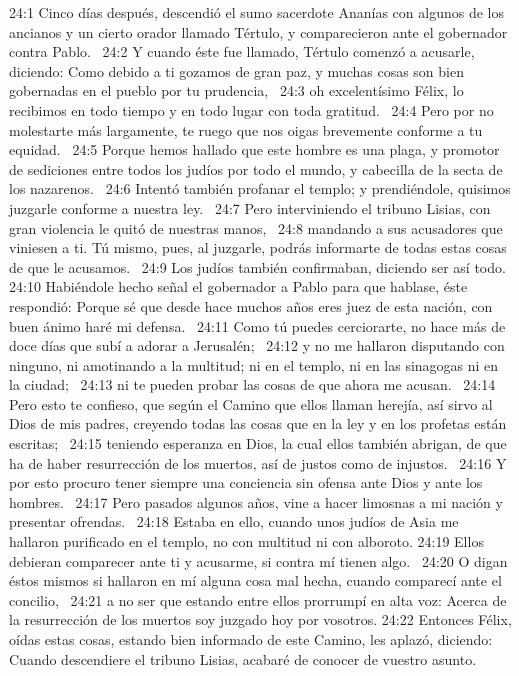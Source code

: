 24:1 Cinco días después, descendió el sumo sacerdote Ananías con algunos de los ancianos y un cierto orador llamado Tértulo, y comparecieron ante el gobernador contra Pablo.  
24:2 Y cuando éste fue llamado, Tértulo comenzó a acusarle, diciendo: Como debido a ti gozamos de gran paz, y muchas cosas son bien gobernadas en el pueblo por tu prudencia,  
24:3 oh excelentísimo Félix, lo recibimos en todo tiempo y en todo lugar con toda gratitud.  
24:4 Pero por no molestarte más largamente, te ruego que nos oigas brevemente conforme a tu equidad.  
24:5 Porque hemos hallado que este hombre es una plaga, y promotor de sediciones entre todos los judíos por todo el mundo, y cabecilla de la secta de los nazarenos.  
24:6 Intentó también profanar el templo; y prendiéndole, quisimos juzgarle conforme a nuestra ley.  
24:7 Pero interviniendo el tribuno Lisias, con gran violencia le quitó de nuestras manos,  
24:8 mandando a sus acusadores que viniesen a ti. Tú mismo, pues, al juzgarle, podrás informarte de todas estas cosas de que le acusamos.  
24:9 Los judíos también confirmaban, diciendo ser así todo.  
24:10 Habiéndole hecho señal el gobernador a Pablo para que hablase, éste respondió: Porque sé que desde hace muchos años eres juez de esta nación, con buen ánimo haré mi defensa.  
24:11 Como tú puedes cerciorarte, no hace más de doce días que subí a adorar a Jerusalén;  
24:12 y no me hallaron disputando con ninguno, ni amotinando a la multitud; ni en el templo, ni en las sinagogas ni en la ciudad;  
24:13 ni te pueden probar las cosas de que ahora me acusan.  
24:14 Pero esto te confieso, que según el Camino que ellos llaman herejía, así sirvo al Dios de mis padres, creyendo todas las cosas que en la ley y en los profetas están escritas;  
24:15 teniendo esperanza en Dios, la cual ellos también abrigan, de que ha de haber resurrección de los muertos, así de justos como de injustos.  
24:16 Y por esto procuro tener siempre una conciencia sin ofensa ante Dios y ante los hombres.  
24:17 Pero pasados algunos años, vine a hacer limosnas a mi nación y presentar ofrendas.  
24:18 Estaba en ello, cuando unos judíos de Asia me hallaron purificado en el templo, no con multitud ni con alboroto. 
24:19 Ellos debieran comparecer ante ti y acusarme, si contra mí tienen algo.  
24:20 O digan éstos mismos si hallaron en mí alguna cosa mal hecha, cuando comparecí ante el concilio,  
24:21 a no ser que estando entre ellos prorrumpí en alta voz: Acerca de la resurrección de los muertos soy juzgado hoy por vosotros. 
24:22 Entonces Félix, oídas estas cosas, estando bien informado de este Camino, les aplazó, diciendo: Cuando descendiere el tribuno Lisias, acabaré de conocer de vuestro asunto.  

